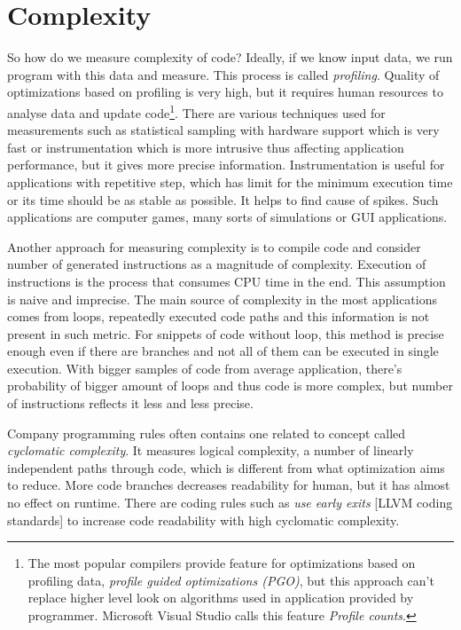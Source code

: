 \section{Complexity}
\label{yield-complexity}
So how do we measure complexity of code? Ideally, if we know input data, we run program with this data and measure. This process is called \emph{profiling}. Quality of optimizations based on profiling is very high, but it requires human resources to analyse data and update code\footnote{The most popular compilers provide feature for optimizations based on profiling data, \emph{profile guided optimizations (PGO)}, but this approach can't replace higher level look on algorithms used in application provided by programmer. Microsoft Visual Studio calls this feature \emph{Profile counts}.}. There are various techniques used for measurements such as statistical sampling with hardware support which is very fast or instrumentation which is more intrusive thus affecting application performance, but it gives more precise information. Instrumentation is useful for applications with repetitive step, which has limit for the minimum execution time or its time should be as stable as possible. It helps to find cause of spikes. Such applications are computer games, many sorts of simulations or GUI applications.

Another approach for measuring complexity is to compile code and consider number of generated instructions as a magnitude of complexity. Execution of instructions is the process that consumes CPU time in the end. This assumption is naive and imprecise. The main source of complexity in the most applications comes from loops, repeatedly executed code paths and this information is not present in such metric. For snippets of code without loop, this method is precise enough even if there are branches and not all of them can be executed in single execution. With bigger samples of code from average application, there's probability of bigger amount of loops and thus code is more complex, but number of instructions reflects it less and less precise.

Company programming rules often contains one related to concept called \emph{cyclomatic complexity}. It measures logical complexity, a number of linearly independent paths through code, which is different from what optimization aims to reduce. More code branches decreases readability for human, but it has almost no effect on runtime. There are coding rules such as \emph{use early exits} [LLVM coding standards] to increase code readability with high cyclomatic complexity.

